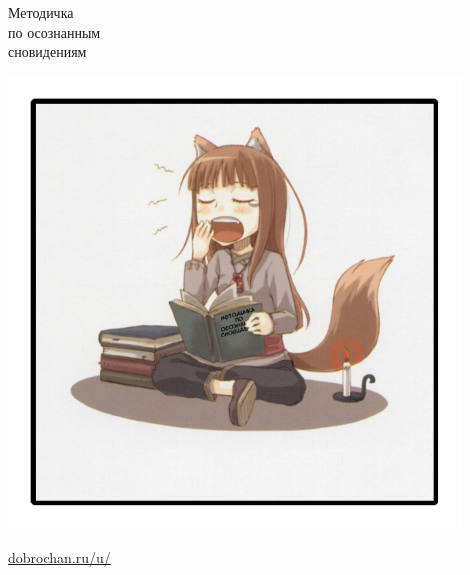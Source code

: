 \begin{titlingpage}


\begin{center}
 \begin{Huge}
   \fontsize{45}{45}\selectfont Методичка\\ по осознанным \\сновидениям\\
	\end{Huge}

\hspace{0.2 cm}

\includegraphics[width=0.9\textwidth]{titleillst.jpg}

\hspace{0.2 cm}

\normalsize

\url{dobrochan.ru/u/}

{\small{}}

\end{center}

\end{titlingpage}
